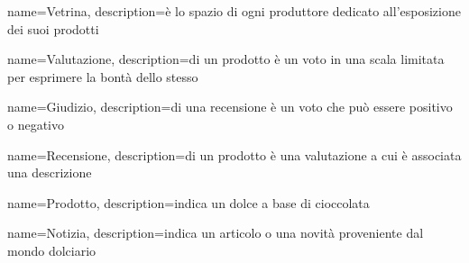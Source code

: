 {
    name={Vetrina},
    description={è lo spazio di ogni produttore dedicato all'esposizione dei suoi prodotti}
}

{
    name={Valutazione},
    description={di un prodotto è un voto in una scala limitata per esprimere la bontà dello stesso}
}

{
    name={Giudizio},
    description={di una recensione è un voto che può essere positivo o negativo}
}

{
    name={Recensione},
    description={di un prodotto è una valutazione a cui è associata una descrizione}
}

{
    name={Prodotto},
    description={indica un dolce a base di cioccolata}
}

{
    name={Notizia},
    description={indica un articolo o una novità proveniente dal mondo dolciario}
}



